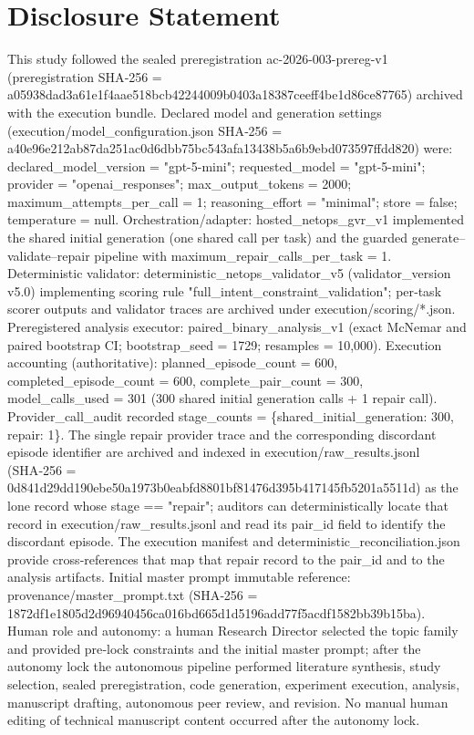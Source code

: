 \documentclass[conference]{IEEEtran}
\begin{document}
\section*{Disclosure Statement}
This study followed the sealed preregistration ac-2026-003-prereg-v1 (preregistration SHA‑256 = a05938da\allowbreak{}d3a61e1f\allowbreak{}4aae518b\allowbreak{}cb422440\allowbreak{}09b0403a\allowbreak{}18387cee\allowbreak{}ff4be1d8\allowbreak{}6ce87765) archived with the execution bundle. Declared model and generation settings (execution/model\_configuration.json SHA‑256 = a40e96e2\allowbreak{}12ab87da\allowbreak{}251ac0d6\allowbreak{}dbb75bc5\allowbreak{}43afa134\allowbreak{}38b5a6b9\allowbreak{}ebd07359\allowbreak{}7ffdd820) were: declared\_model\_version = "gpt-5-mini"; requested\_model = "gpt-5-mini"; provider = "openai\_responses"; max\_output\_tokens = 2000; maximum\_attempts\_per\_call = 1; reasoning\_effort = "minimal"; store = false; temperature = null. Orchestration/adapter: hosted\_netops\_gvr\_v1 implemented the shared initial generation (one shared call per task) and the guarded generate--validate--repair pipeline with maximum\_repair\_calls\_per\_task = 1. Deterministic validator: deterministic\_netops\_validator\_v5 (validator\_version v5.0) implementing scoring rule "full\_intent\_constraint\_validation"; per‑task scorer outputs and validator traces are archived under execution/scoring/*.json. Preregistered analysis executor: paired\_binary\_analysis\_v1 (exact McNemar and paired bootstrap CI; bootstrap\_seed = 1729; resamples = 10,000). Execution accounting (authoritative): planned\_episode\_count = 600, completed\_episode\_count = 600, complete\_pair\_count = 300, model\_calls\_used = 301 (300 shared initial generation calls + 1 repair call). Provider\_call\_audit recorded stage\_counts = \{shared\_initial\_generation: 300, repair: 1\}. The single repair provider trace and the corresponding discordant episode identifier are archived and indexed in execution/raw\_results.jsonl (SHA‑256 = 0d841d29\allowbreak{}dd190ebe\allowbreak{}50a1973b\allowbreak{}0eabfd88\allowbreak{}01bf8147\allowbreak{}6d395b41\allowbreak{}7145fb52\allowbreak{}01a5511d) as the lone record whose stage == "repair"; auditors can deterministically locate that record in execution/raw\_results.jsonl and read its pair\_id field to identify the discordant episode. The execution manifest and deterministic\_reconciliation.json provide cross‑references that map that repair record to the pair\_id and to the analysis artifacts. Initial master prompt immutable reference: provenance/master\_prompt.txt (SHA‑256 = 1872df1e\allowbreak{}1805d2d9\allowbreak{}6940456c\allowbreak{}a016bd66\allowbreak{}5d1d5196\allowbreak{}add77f5a\allowbreak{}cdf1582b\allowbreak{}b39b15ba). Human role and autonomy: a human Research Director selected the topic family and provided pre‑lock constraints and the initial master prompt; after the autonomy lock the autonomous pipeline performed literature synthesis, study selection, sealed preregistration, code generation, experiment execution, analysis, manuscript drafting, autonomous peer review, and revision. No manual human editing of technical manuscript content occurred after the autonomy lock.
\end{document}
